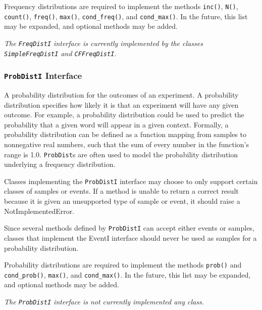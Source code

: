 \documentclass{article}
\begin{document}
    Frequency distributions are required to implement the methods
    \texttt{inc()}, \texttt{N()}, \texttt{count()},
    \texttt{freq()}, \texttt{max()}, \texttt{cond\_freq()}, 
    and \texttt{cond\_max()}.  In the future, this list may be
    expanded, and optional methods may be added.

\vspace{2mm}\noindent
\textit{The \texttt{FreqDistI} interface is currently implemented by the
classes \texttt{SimpleFreqDistI} and \texttt{CFFreqDistI}.}

\subsubsection{\texttt{ProbDistI} Interface}

    A probability distribution for the outcomes of an experiment.  A
    probability distribution specifies how likely it is that an
    experiment will have any given outcome.  For example, a
    probability distribution could be used to predict the probability
    that a given word will appear in a given context.  Formally, a
    probability distribution can be defined as a function mapping from
    samples to nonnegative real numbers, such that the sum of every
    number in the function's range is 1.0.  \texttt{ProbDist}s are
    often used to model the probability distribution underlying a
    frequency distribution. 

    Classes implementing the \texttt{ProbDistI} interface may
    choose to only support certain classes of samples or events.  If a
    method is unable to return a correct result because it is given an
    unsupported type of sample or event, it should raise a
    NotImplementedError. 

    Since several methods defined by \texttt{ProbDistI} can accept
    either events or samples, classes that implement the EventI
    interface should never be used as samples for a probability
    distribution.

    Probability distributions are required to implement the methods
    \texttt{prob()} and \texttt{cond\_prob()},
    \texttt{max()}, and \texttt{cond\_max()}.  In the future,
    this list may be expanded, and optional methods may be added.

\vspace{2mm}\noindent
\textit{The \texttt{ProbDistI} interface is not currently implemented
any class.}
\end{document}
